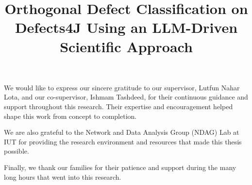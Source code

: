 \documentclass{iutbscthesis}
\title{Orthogonal Defect Classification on Defects4J Using an LLM-Driven Scientific Approach}
\begin{document}

\coverpage
{}
\titlepage
\declarationofcandidate


\tableofcontents
\listoffigures
\listoftables

\clearpage

\begin{abbreviations}
\end{abbreviations}

\begin{acknowledgement}
We would like to express our sincere gratitude to our supervisor, Lutfun Nahar Lota, and our co-supervisor, Ishmam Tashdeed, for their continuous guidance and support throughout this research. Their expertise and encouragement helped shape this work from concept to completion.

We are also grateful to the Network and Data Analysis Group (NDAG) Lab at IUT for providing the research environment and resources that made this thesis possible.

Finally, we thank our families for their patience and support during the many long hours that went into this research.
\end{acknowledgement}
\end{document}
